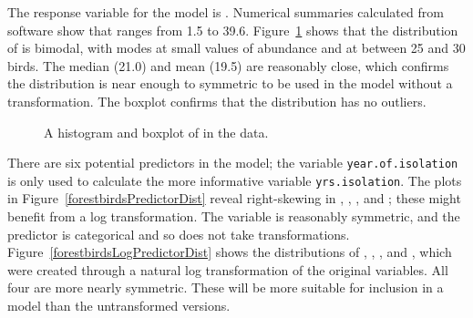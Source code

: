 The response variable for the model is . Numerical summaries calculated from software show that  ranges from 1.5 to 39.6. Figure~\ref{forestbirdsAbundanceHistandBox} shows that the distribution of  is bimodal, with modes at small values of abundance and at between 25 and 30 birds. The median (21.0) and mean (19.5) are reasonably close, which confirms the distribution is near enough to symmetric to be used in the model without a transformation. The boxplot confirms that the distribution has no outliers.

	\begin{figure}[h!]
		\centering
		\caption{A histogram  and boxplot  of  in the  data.}
		\label{forestbirdsAbundanceHistandBox}
	\end{figure}	
	
There are six potential predictors in the model; the variable \texttt{year.of.isolation} is only used to calculate the more informative variable \texttt{yrs.isolation}. The plots in Figure~\ref{forestbirdsPredictorDist} reveal right-skewing in , , , and ; these might benefit from a log transformation. The variable  is reasonably symmetric, and the predictor  is categorical and so does not take transformations. Figure~\ref{forestbirdsLogPredictorDist} shows the distributions of , , , and , which were created through a natural log transformation of the original variables. All four are more nearly symmetric. These will be more suitable for inclusion in a model than the untransformed versions.

